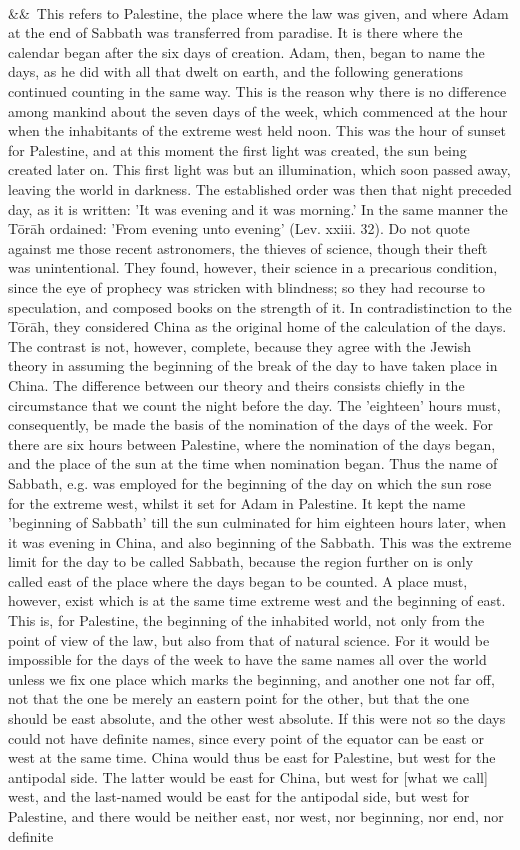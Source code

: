 \documentclass[12pt]{article}
\newcommand{\para}[1][]{\par\noindent\ifx&#1&\else\textsuperscript{\footnotesize #1}~\fi}
\begin{document}
\para This refers to Palestine, the place where the law was given, and where Adam at the end of Sabbath was transferred from paradise. It is there where the calendar began after the six days of creation. Adam, then, began to name the days, as he did with all that dwelt on earth, and the following generations continued counting in the same way. This is the reason why there is no difference among mankind about the seven days of the week, which commenced at the hour when the inhabitants of the extreme west held noon. This was the hour of sunset for Palestine, and at this moment the first light was created, the sun being created later on. This first light was but an illumination, which soon passed away, leaving the world in darkness. The established order was then that night preceded day, as it is written: 'It was evening and it was morning.' In the same manner the Tōrāh ordained: 'From evening unto evening' (Lev. xxiii. 32). Do not quote against me those recent astronomers, the thieves of science, though their theft was unintentional. They found, however, their science in a precarious condition, since the eye of prophecy was stricken with blindness; so they had recourse to speculation, and composed books on the strength of it. In contradistinction to the Tōrāh, they considered China as the original home of the calculation of the days. The contrast is not, however, complete, because they agree with the Jewish theory in assuming the beginning of the break of the day to have taken place in China. The difference between our theory and theirs consists chiefly in the circumstance that we count the night before the day. The 'eighteen' hours must, consequently, be made the basis of the nomination of the days of the week. For there are six hours between Palestine, where the nomination of the days began, and the place of the sun at the time when nomination began. Thus the name of Sabbath, e.g. was employed for the beginning of the day on which the sun rose for the extreme west, whilst it set for Adam in Palestine. It kept the name 'beginning of Sabbath' till the sun culminated for him eighteen hours later, when it was evening in China, and also beginning of the Sabbath. This was the extreme limit for the day to be called Sabbath, because the region further on is only called east of the place where the days began to be counted. A place must, however, exist which is at the same time extreme west and the beginning of east. This is, for Palestine, the beginning of the inhabited world, not only from the point of view of the law, but also from that of natural science. For it would be impossible for the days of the week to have the same names all over the world unless we fix one place which marks the beginning, and another one not far off, not that the one be merely an eastern point for the other, but that the one should be east absolute, and the other west absolute. If this were not so the days could not have definite names, since every point of the equator can be east or west at the same time. China would thus be east for Palestine, but west for the antipodal side. The latter would be east for China, but west for [what we call] west, and the last-named would be east for the antipodal side, but west for Palestine, and there would be neither east, nor west, nor beginning, nor end, nor definite 
\end{document}
